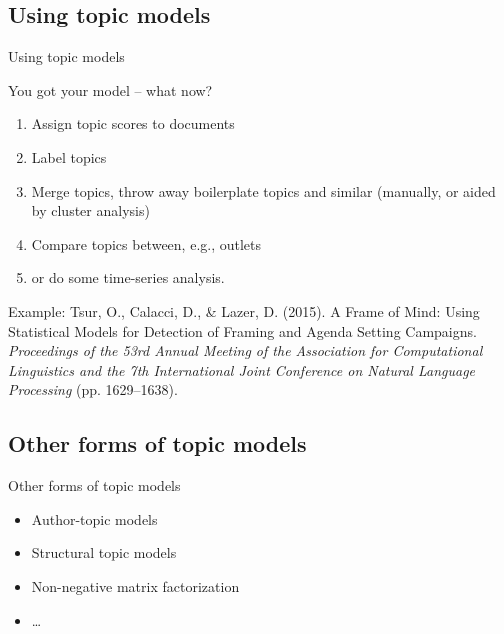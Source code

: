 \documentclass[compress]{beamer}
\begin{document}


\subsection{Using topic models}

\begin{frame}{Using topic models}
	
	You got your model -- what now?
	
	\begin{enumerate}
		\item Assign topic scores to documents
		\item Label topics
		\item Merge topics, throw away boilerplate topics and similar (manually, or aided by cluster analysis)
		\item Compare topics between, e.g., outlets
		\item or do some time-series analysis.
	\end{enumerate}
	
	
	Example:
	\tiny{Tsur, O., Calacci, D., \& Lazer, D. (2015). A Frame of Mind: Using Statistical Models for Detection of Framing and Agenda Setting Campaigns. \textit{Proceedings of the 53rd Annual Meeting of the Association for Computational Linguistics and the 7th International Joint Conference on Natural Language Processing} (pp. 1629–1638).}
	
	
	
\end{frame}



\subsection{Other forms of topic models}

\begin{frame}{Other forms of topic models}
	\begin{itemize}
		\item Author-topic models
		\item Structural topic models
		\item Non-negative matrix factorization
		\item \ldots
	\end{itemize}
\end{frame}
\end{document}
